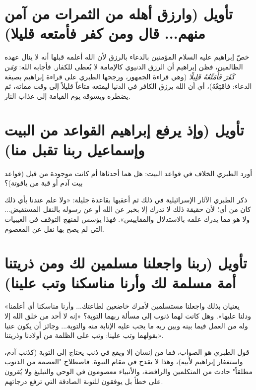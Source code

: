 \separator

\section{تأويل (وارزق أهله من الثمرات من آمن منهم... قال ومن كفر فأمتعه قليلا)}
خصّ إبراهيم عليه السلام المؤمنين بالدعاء بالرزق لأن الله أعلمه قبلها أنه لا ينال عهده الظالمين، فظن إبراهيم أن الرزق الدنيوي كالإمامة لا يُعطى للكفار.
فأجابه الله: \textit{وَمَن كَفَرَ فَأُمَتِّعُهُ قَلِيلًا} (وهي قراءة الجمهور، ورجحها الطبري على قراءة إبراهيم بصيغة الدعاء: فامْتِعْهُ)، أي أن الله يرزق الكافر في الدنيا ليمتعه متاعاً قليلاً إلى وقت مماته، ثم يضطره ويسوقه يوم القيامة إلى عذاب النار.

\separator

\section{تأويل (وإذ يرفع إبراهيم القواعد من البيت وإسماعيل ربنا تقبل منا)}
أورد الطبري الخلاف في قواعد البيت: هل هما أحدثاها أم كانت موجودة من قبل (قواعد بيت آدم أو قبة من ياقوتة)؟
\begin{fawaid}
ذكر الطبري الآثار الإسرائيلية في ذلك ثم أعقبها بقاعدة جليلة: «ولا علم عندنا بأي ذلك كان من أي؛ لأن حقيقة ذلك لا تدرك إلا بخبر عن الله أو عن رسوله بالنقل المستفيض... ولا هو مما يدرك علمه بالاستدلال والمقاييس». فهذا يؤسس لمنهج التوقف في الغيبيات التي لم يصح بها نقل عن المعصوم.
\end{fawaid}

\separator

\section{تأويل (ربنا واجعلنا مسلمين لك ومن ذريتنا أمة مسلمة لك وأرنا مناسكنا وتب علينا)}
 «يعنيان بذلك واجعلنا مستسلمين لأمرك خاضعين لطاعتك... وأرنا مناسكنا أي أعلمنا ودلنا عليها».
 وهل كانت لهما ذنوب إلى مسألة ربهما التوبة؟
 «إنه لا أحد من خلق الله إلا وله من العمل فيما بينه وبين ربه ما يجب عليه الإنابة منه والتوبة... وجائز أن يكون عنيا بقولهما وتب علينا: وتب على الظلمة من أولادنا وذريتنا».

\begin{fawaid}
قول الطبري هو الصواب، فما من إنسان إلا ويقع في ذنب يحتاج إلى التوبة (كذنب آدم، واستغفار إبراهيم لأبيه)، وهذا لا يقدح في مقام النبوة. فاصطلاح "العصمة من الذنوب مطلقاً" حادث من المتكلمين والرافضة، والأنبياء معصومون في الوحي والتبليغ ولا يُقرون على خطأ بل يوفقون للتوبة الصادقة التي ترفع درجاتهم.
\end{fawaid}


